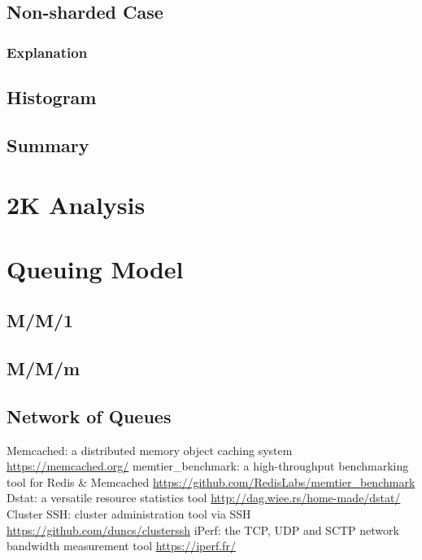 \documentclass[11pt,a4paper]{article}
\begin{document}
\subsection{Non-sharded Case} \label{sec:gmg-false}

\subsubsection{Explanation} \label{sec:gmg-false-exp}

\subsection{Histogram} \label{sec:gmg-hist}

\subsection{Summary} \label{sec:gmg-summary}

\section{2K Analysis} \label{sec:2k}

\section{Queuing Model} \label{sec:queueing-model}

\subsection{M/M/1} \label{sec:mm1}

\subsection{M/M/m} \label{sec:mmm}

\subsection{Network of Queues} \label{sec:network-of-queues}

\begin{thebibliography}{9}
 Memcached: a distributed memory object caching system \url{https://memcached.org/}
 memtier\_benchmark: a high-throughput benchmarking tool for Redis \& Memcached \url{https://github.com/RedisLabs/memtier\_benchmark}
 Dstat: a versatile resource statistics tool \url{http://dag.wiee.rs/home-made/dstat/}
 Cluster SSH: cluster administration tool via SSH \url{https://github.com/duncs/clusterssh}
 iPerf: the TCP, UDP and SCTP network bandwidth measurement tool \url{https://iperf.fr/}
\end{thebibliography}
\end{document}
